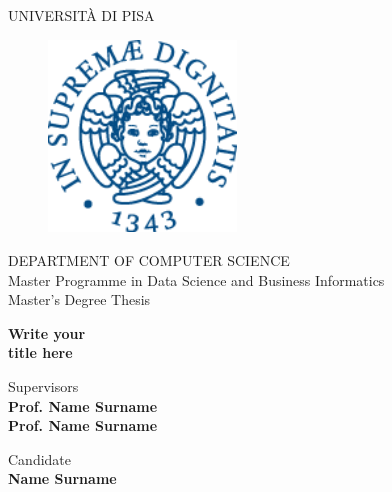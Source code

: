 \begin{titlepage}
\begin{center}
    \large{UNIVERSITÀ DI PISA}
    \vspace{5mm}
\end{center}
%
%
\begin{figure}[!htb]
    \centering
    \includegraphics[width=5cm]{fig/logo.png}
\end{figure}
%
%
\begin{center}
    \vspace{2mm}
    \Large{DEPARTMENT OF COMPUTER SCIENCE}
    \\ \large{Master Programme in Data Science and Business Informatics}
    \vspace{3mm}
    \\ \LARGE{Master's Degree Thesis}
\end{center}
%
%
\vspace{5mm}
\begin{center}
    \Huge \bfseries
    {\LARGE{\bf Write your \\
           title here}}
\end{center}
%
\vspace{20mm}
%
\begin{minipage}[t]{0.47\textwidth}{
    \large{Supervisors}{
        \normalsize\vspace{3mm}\bf \\ 
        \large{
            Prof. Name Surname \vspace{2mm}\\
            Prof. Name Surname
        }
    }
}
\end{minipage}
\hfill
\begin{minipage}[t]{0.47\textwidth}\raggedleft
    {\large{Candidate}{\normalsize\vspace{2mm} \bf
    \\ \large{Name Surname\\ }}}
\end{minipage}


\vspace{25mm}

\end{titlepage}